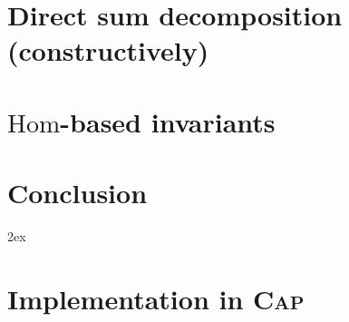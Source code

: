 \documentclass{article}
\begin{document}
\newpage
\section{Direct sum decomposition (constructively)}


\newpage
\section{$\mathrm{Hom}$-based invariants}



\section{Conclusion}


\begingroup
     \parindent 0pt
     \parskip 2ex
     \def\enotesize{\normalsize}
     \theendnotes
\endgroup 



\appendix
\renewcommand{\thesection}{\Alph{section}}
\section{Implementation in \textsc{Cap}}

\end{document}
